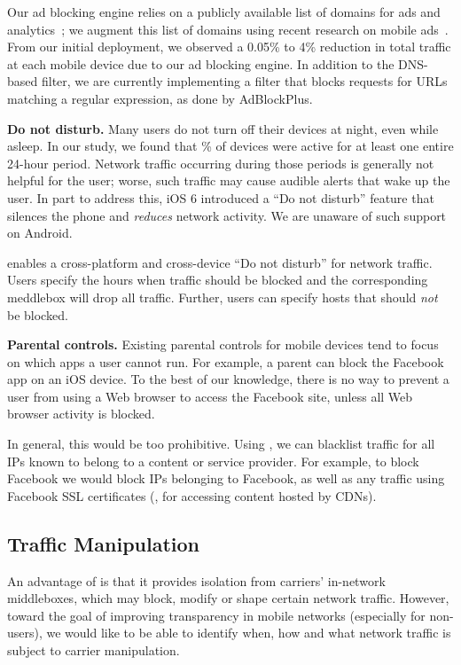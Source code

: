 Our ad blocking engine relies on a publicly available list of domains for ads and
analytics~\cite{YoyoAds}; we augment this list of domains using 
recent research on mobile ads~\cite{hornyack:appfence,
  Leontiadis:2012:AdsMobile}. From our initial deployment, we observed a 0.05\% to 4\% reduction
in total traffic at each mobile device due to our ad blocking engine. 
In addition to the DNS-based filter, we are currently implementing a filter that blocks 
requests for URLs matching a regular expression, as done by AdBlockPlus.


\noindent\textbf{Do not disturb.} 
Many users do not turn off their devices at night, even while asleep. In our study, we found that 
\% of devices were active for at least one entire 24-hour period. Network 
traffic occurring during those periods is generally not helpful for the user; worse, 
such traffic may cause audible alerts that wake up the user. In part to address this, 
iOS 6 introduced a ``Do not disturb'' feature that silences the phone and \emph{reduces} 
network activity. We are unaware of such support on Android.

\meddle enables a cross-platform and cross-device ``Do not disturb'' for network 
traffic. Users specify the hours when traffic should be blocked and the corresponding 
meddlebox will drop all traffic. Further, users can specify hosts that should \emph{not} be 
blocked. 

\noindent\textbf{Parental controls.} 
Existing parental controls for mobile devices tend to focus on which apps a user 
cannot run. For example, a parent can block the Facebook app on an iOS device. 
To the best of our knowledge, there is no way to prevent a user from using a 
Web browser to access the Facebook site, unless all Web browser activity is blocked. 

In general, this would be too prohibitive. Using \meddle, we can blacklist traffic for 
all IPs known to belong to a content or service provider. For example, to block 
Facebook we would block IPs belonging to Facebook, as well as any traffic using Facebook 
SSL certificates (\eg, for accessing content hosted by CDNs). 

\subsection{Traffic Manipulation}
An advantage of \meddle is that it provides isolation from carriers' in-network 
middleboxes, which may block, modify or shape certain network traffic. However, 
toward the goal of improving transparency in mobile networks (especially for 
non-\meddle users), we would like to be able to identify when, how and what 
network traffic is subject to carrier manipulation. 

